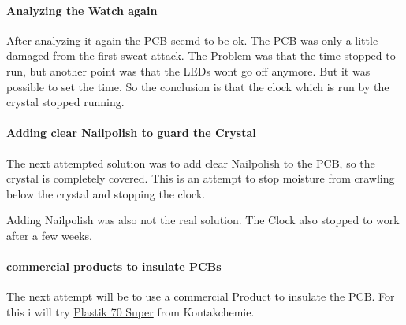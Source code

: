 \paragraph{Analyzing the Watch again}
After analyzing it again the PCB seemd to be ok. The PCB was only a little damaged from the first sweat attack.
The Problem was that the time stopped to run, but another point was that the LEDs wont go off anymore. 
But it was possible to set the time. 
So the conclusion is that the clock which is run by the crystal stopped running.
\paragraph{Adding clear Nailpolish to guard the Crystal}
The next attempted solution was to add clear Nailpolish to the PCB, so the crystal is completely covered. This is an attempt to stop moisture from crawling below the crystal and stopping the clock.

Adding Nailpolish was also not the real solution. The Clock also stopped to work after a few weeks.

\paragraph{commercial products to insulate PCBs}
The next attempt will be to use a commercial Product to insulate the PCB.
For this i will try \href{https://www.reichelt.de/korrosionsschutzlack-plastik-70-super-400-ml-isolierlack-kontakt-32046-p125737.html}{Plastik 70 Super} from Kontakchemie.
